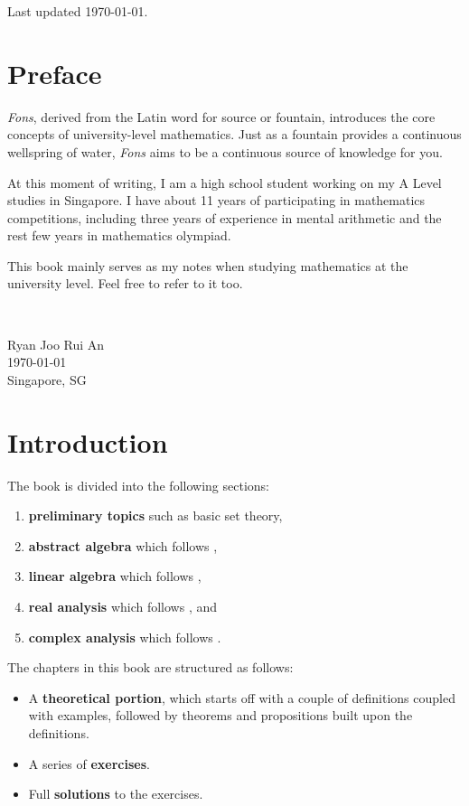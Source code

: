 \documentclass[12pt,a4 paper]{extreport}
\begin{document}
Last updated \today.
\thispagestyle{empty}

\chapter*{Preface}
\emph{Fons}, derived from the Latin word for source or fountain, introduces the core concepts of university-level mathematics. Just as a fountain provides a continuous wellspring of water, \emph{Fons} aims to be a continuous source of knowledge for you.

At this moment of writing, I am a high school student working on my A Level studies in Singapore. I have about 11 years of participating in mathematics competitions, including three years of experience in mental arithmetic and the rest few years in mathematics olympiad.

This book mainly serves as my notes when studying mathematics at the university level. Feel free to refer to it too.

\

\begin{flushright}
Ryan Joo Rui An\\
\today\\
Singapore, SG
\end{flushright}
\pagebreak

\chapter*{Introduction}
The book is divided into the following sections:
\begin{enumerate}
\item \textbf{preliminary topics} such as basic set theory, 
\item \textbf{abstract algebra} which follows \cite{dummit-foote}, 
\item \textbf{linear algebra} which follows \cite{hoffman-kunze}, 
\item \textbf{real analysis} which follows \cite{rudin,apostol}, and
\item \textbf{complex analysis} which follows \cite{ahlfors}.
\end{enumerate}

The chapters in this book are structured as follows:
\begin{itemize}
\item A \textbf{theoretical portion}, which starts off with a couple of definitions coupled with examples, followed by theorems and propositions built upon the definitions.
\item A series of \textbf{exercises}.
\item Full \textbf{solutions} to the exercises.
\end{itemize}
\end{document}
